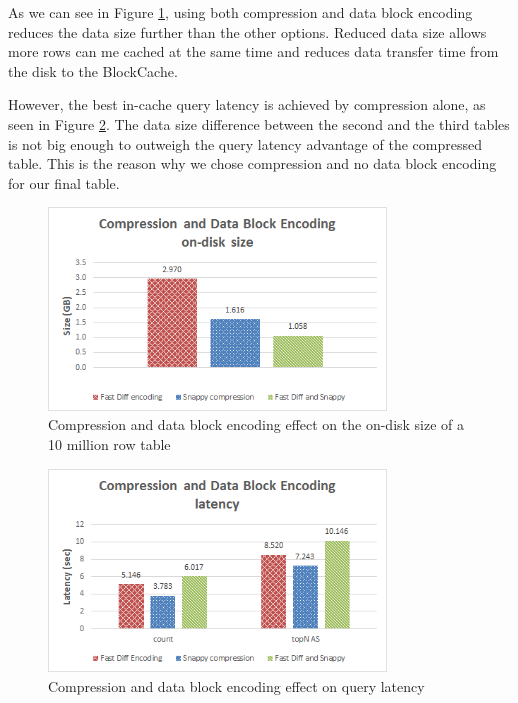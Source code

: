 As we can see in Figure \ref{figure:benchmarks_hbase_compression_encoding_size}, using both compression and data block encoding reduces the data size further than the other options. Reduced data size allows more rows can me cached at the same time and reduces data transfer time from the disk to the BlockCache.

However, the best in-cache query latency is achieved by compression alone, as seen in Figure \ref{figure:benchmarks_hbase_compression_encoding_latency}. The data size difference between the second and the third tables is not big enough to outweigh the query latency advantage of the compressed table. This is the reason why we chose compression and no data block encoding for our final table.

\bigskip
\bigskip
\bigskip

\begin{figure}[H]
\centering
\includegraphics[width=0.8\textwidth]{figures/benchmarks_hbase_compression_encoding_size}
\caption{Compression and data block encoding effect on the on-disk size of a 10 million row table}
\label{figure:benchmarks_hbase_compression_encoding_size}
\end{figure}

\begin{figure}[H]
\centering
\includegraphics[width=0.8\textwidth]{figures/benchmarks_hbase_compression_encoding_latency}
\caption{Compression and data block encoding effect on query latency}
\label{figure:benchmarks_hbase_compression_encoding_latency}
\end{figure}


